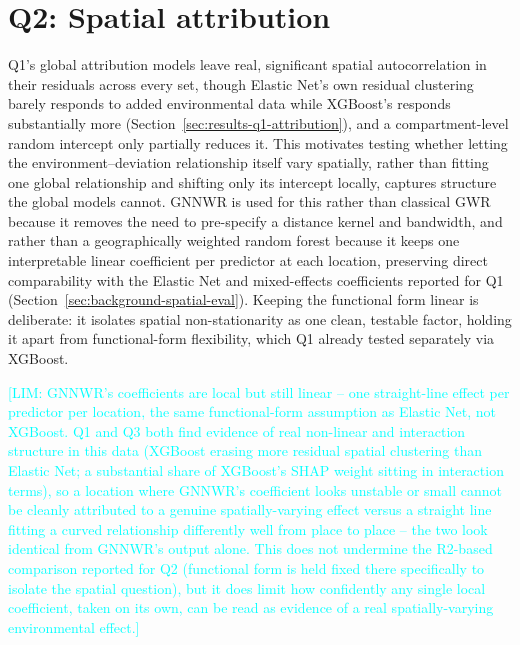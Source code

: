 \documentclass[logo,msc,ai]{infthesis}           %
\newcommand{\limit}[1]{\textcolor{cyan}{[LIM: #1]}}
\begin{document}
\section{Q2: Spatial attribution}
\label{sec:rq3-method}
\label{sec:q2-method}

Q1's global attribution models leave real, significant spatial autocorrelation in their residuals across every set, though Elastic Net's own residual clustering barely responds to added environmental data while XGBoost's responds substantially more (Section~\ref{sec:results-q1-attribution}), and a compartment-level random intercept only partially reduces it. This motivates testing whether letting the environment--deviation relationship itself vary spatially, rather than fitting one global relationship and shifting only its intercept locally, captures structure the global models cannot. GNNWR is used for this rather than classical GWR because it removes the need to pre-specify a distance kernel and bandwidth, and rather than a geographically weighted random forest because it keeps one interpretable linear coefficient per predictor at each location, preserving direct comparability with the Elastic Net and mixed-effects coefficients reported for Q1 (Section~\ref{sec:background-spatial-eval}). Keeping the functional form linear is deliberate: it isolates spatial non-stationarity as one clean, testable factor, holding it apart from functional-form flexibility, which Q1 already tested separately via XGBoost.

\limit{GNNWR's coefficients are local but still linear -- one straight-line effect per predictor per location, the same functional-form assumption as Elastic Net, not XGBoost. Q1 and Q3 both find evidence of real non-linear and interaction structure in this data (XGBoost erasing more residual spatial clustering than Elastic Net; a substantial share of XGBoost's SHAP weight sitting in interaction terms), so a location where GNNWR's coefficient looks unstable or small cannot be cleanly attributed to a genuine spatially-varying effect versus a straight line fitting a curved relationship differently well from place to place -- the two look identical from GNNWR's output alone. This does not undermine the R2-based comparison reported for Q2 (functional form is held fixed there specifically to isolate the spatial question), but it does limit how confidently any single local coefficient, taken on its own, can be read as evidence of a real spatially-varying environmental effect.}
\end{document}
